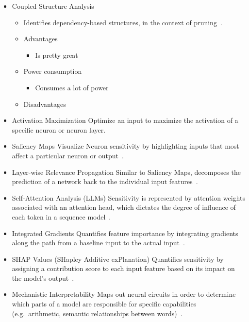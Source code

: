 \documentclass{article}
\begin{document}
    \begin{itemize}
        \item Coupled Structure Analysis
        \begin{itemize}
            \item Identifies dependency-based structures, in the context of pruning~\cite{ma2023llm}.
            \item Advantages
            \begin{itemize}
                \item Is pretty great
            \end{itemize}
            \item Power consumption
            \begin{itemize}
                \item Consumes a lot of power
            \end{itemize}
            \item Disadvantages
        \end{itemize}
        \item Activation Maximization
        \subitem Optimize an input to maximize the activation of a specific neuron or neuron layer.
        \item Saliency Maps
        \subitem Visualize Neuron sensitivity by highlighting inputs that most affect a particular neuron or output~\cite{hsu2023explainable}.
        \item Layer-wise Relevance Propagation
        \subitem Similar to Saliency Maps, decomposes the prediction of a network back to the individual input features~\cite{jia2022interpreting}.
        \item Self-Attention Analysis (LLMs)
        \subitem Sensitivity is represented by attention weights associated with an attention head, which dictates the degree of influence of each token in a sequence model~\cite{shi2021sparsebert}.
        \item Integrated Gradients
        \subitem Quantifies feature importance by integrating gradients along the path from a baseline input to the actual input~\cite{sundararajan2017axiomatic}.
        \item SHAP Values (SHapley Additive exPlanation)
        \subitem Quantifies sensitivity by assigning a contribution score to each input feature based on its impact on the model’s output~\cite{nohara2022explanation}.
        \item Mechanistic Interpretability
        \subitem Maps out neural circuits in order to determine which parts of a model are responsible for specific capabilities (e.g.\ arithmetic, semantic relationships between words)~\cite{singh2024rethinking}.
    \end{itemize}
\end{document}
